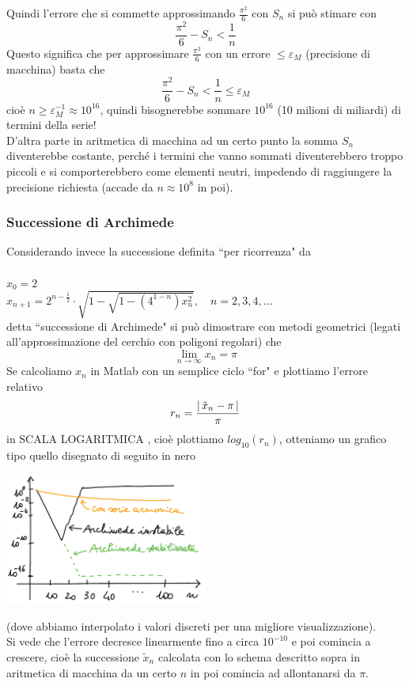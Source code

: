 \documentclass[12pt]{article}
\DeclarePairedDelimiter{\abs}{\lvert}{\rvert}
\begin{document}
Quindi l'errore che si commette approssimando $\frac{\pi^2}{6}$ con $S_n$ si può stimare con \[ \frac{\pi^2}{6}-S_n < \frac{1}{n} \]
Questo significa che per approssimare $\frac{\pi^2}{6}$ con un errore $\le \varepsilon_M$ (precisione di macchina) basta che 
\[\frac{\pi^2}{6}-S_n < \frac{1}{n} \le \varepsilon_M \]
cioè $n \ge \varepsilon_M^{-1} \approx 10^{16}$, quindi bisognerebbe sommare $10^{16}$ (10 milioni di miliardi) di termini della serie!\\
D'altra parte in aritmetica di macchina ad un certo punto la somma $S_n$ diventerebbe costante, perché i termini che vanno sommati diventerebbero troppo piccoli e si comporterebbero come elementi neutri, impedendo di raggiungere la precisione richiesta (accade da $n\approx10^8$ in poi).

\subsubsection{Successione di Archimede}
Considerando invece la successione definita ``per ricorrenza" da\\\\
$x_0=2$\\
$x_{n+1}=2^{n-\frac{1}{2}}\cdot\sqrt{1-\sqrt{1-(4^{1-n})x_{n}^2}}, \quad n=2,3,4,\dotsc$\\
detta ``successione di Archimede" si può dimostrare con metodi geometrici (legati all'approssimazione del cerchio con poligoni regolari) che 
\[ \lim_{n\to\infty} x_n= \pi \]
Se calcoliamo $x_n$ in Matlab con un semplice ciclo ``for" e plottiamo l'errore relativo \[ r_n=\frac{\abs{\,\tilde{x}_n-\pi\,}}{\pi} \] in SCALA LOGARITMICA , cioè plottiamo $log_{10}(r_n)$, otteniamo un grafico tipo quello disegnato di seguito in nero
\begin{center}
    \includegraphics[width=0.5\textwidth]{img14}
\end{center}
(dove abbiamo interpolato i valori discreti per una migliore visualizzazione).\\
Si vede che l'errore decresce linearmente fino a circa $10^{-10}$ e poi comincia a crescere, cioè la successione $\tilde{x}_n$ calcolata con lo schema descritto sopra in aritmetica di macchina da un certo $n$ in poi comincia ad allontanarsi da $\pi$.\\
\end{document}

